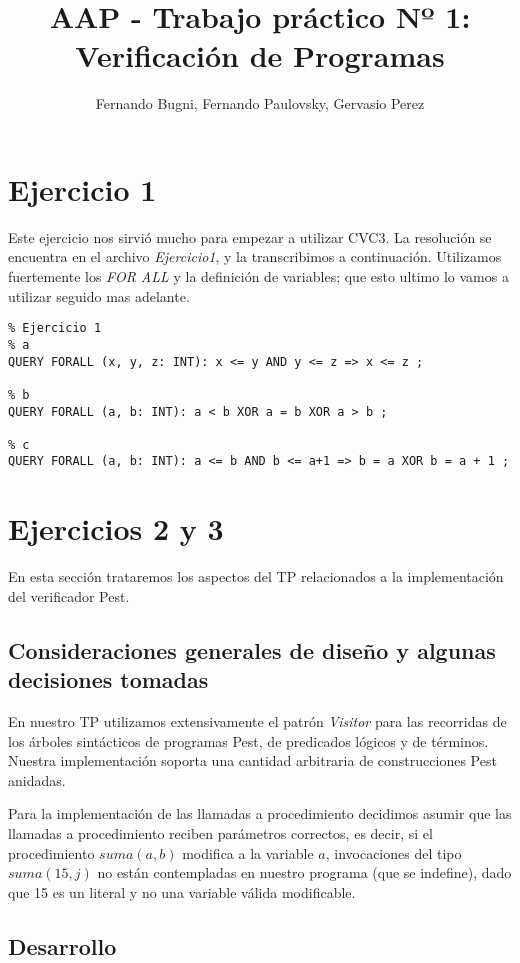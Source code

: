 \documentclass[a4paper]{article}
\author{Fernando Bugni, Fernando Paulovsky, Gervasio Perez}
\title{AAP - Trabajo práctico Nº 1: Verificación de Programas}
\begin{document}
\maketitle

\section{Ejercicio 1}

Este ejercicio nos sirvió mucho para empezar a utilizar CVC3. La resolución se encuentra en el archivo \textit{Ejercicio1}, y la transcribimos a continuación. Utilizamos fuertemente los \textit{FOR ALL} y la definición de variables; que esto ultimo lo vamos a utilizar seguido mas adelante.  

\begin{verbatim}
% Ejercicio 1
% a
QUERY FORALL (x, y, z: INT): x <= y AND y <= z => x <= z ;

% b
QUERY FORALL (a, b: INT): a < b XOR a = b XOR a > b ;

% c
QUERY FORALL (a, b: INT): a <= b AND b <= a+1 => b = a XOR b = a + 1 ;
\end{verbatim}

\section{Ejercicios 2 y 3}

En esta sección trataremos los aspectos del TP relacionados a la implementación del verificador Pest.

\subsection{Consideraciones generales de diseño y algunas decisiones tomadas}

En nuestro TP utilizamos extensivamente el patrón \textit{Visitor} para las recorridas de los árboles sintácticos de programas Pest, de predicados lógicos y de términos. Nuestra implementación soporta una cantidad arbitraria de construcciones Pest anidadas.

Para la implementación de las llamadas a procedimiento decidimos asumir que las llamadas a procedimiento reciben parámetros correctos, es decir, si el procedimiento $suma(a,b)$ modifica a la variable $a$, invocaciones del tipo $suma(15,j)$ no están contempladas en nuestro programa (que se indefine), dado que 15 es un literal y no una variable válida modificable.

\subsection{Desarrollo}
\end{document}
